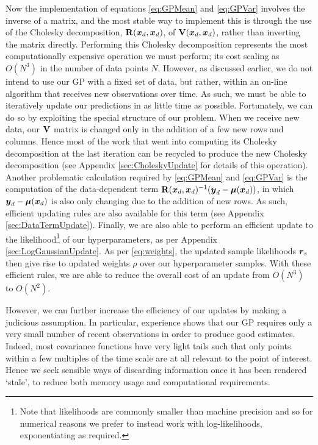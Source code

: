 \documentclass{acmsmall}
\begin{document}
\noindent Now the implementation of equations \eqref{eq:GPMean} and \eqref{eq:GPVar} involves the inverse of a matrix, and the most stable way to implement this is through the use of the Cholesky decomposition, $\mathbf{R}(\boldsymbol{x}_d,\boldsymbol{x}_d)$, of $\mathbf{V}(\boldsymbol{x}_d,\boldsymbol{x}_d)$, rather than inverting the matrix directly. %
Performing this Cholesky decomposition represents the most computationally expensive operation we must perform; its cost scaling as $O(N^3)$ in the number of data points $N$. However, as discussed earlier, we do not intend to use our GP with a fixed set of data, but rather, within an on-line algorithm that receives new observations over time. As such, we must be able to iteratively update our predictions in as little time as possible. Fortunately, we can do so by exploiting the special structure of our problem. When we receive new data, our $\mathbf{V}$ matrix is changed only in the addition of a few new rows and columns. Hence most of the work that went into computing its Cholesky decomposition at the last iteration can be recycled to produce the new Cholesky decomposition (see Appendix \ref{sec:CholeskyUpdate} for details of this operation). Another problematic calculation required by \eqref{eq:GPMean} and \eqref{eq:GPVar} is the computation of the data-dependent term $\mathbf{R}(\boldsymbol{x}_d,\boldsymbol{x}_d)^{-1}(\boldsymbol{y}_d-\boldsymbol{\mu}(\boldsymbol{x}_d))$, in which $\boldsymbol{y}_d-\boldsymbol{\mu}(\boldsymbol{x}_d)$ is also only changing due to the addition of new rows. As such, efficient updating rules are also available for this term (see Appendix \ref{sec:DataTermUpdate}). Finally, we are also able to perform an efficient update to the likelihood\footnote{Note that likelihoods are commonly smaller than machine precision and so for numerical reasons we prefer to instead work with log-likelihoods, exponentiating as required.} of our hyperparameters, as per Appendix \ref{sec:LogGaussianUpdate}. As per \eqref{eq:weights}, the updated sample likelihoods $\boldsymbol{r}_s$ then give rise to updated weights $\rho$ over our hyperparameter samples. With these efficient rules, we are able to reduce the overall cost of an update from $O(N^3)$ to $O(N^2)$.

However, we can further increase the efficiency of our updates by making a judicious assumption. In particular, experience shows that our GP requires only a very small number of recent observations in order to produce good estimates. Indeed, most covariance functions have very light tails such that only points within a few multiples of the time scale are at all relevant to the point of interest. Hence we seek sensible ways of discarding information once it has been rendered `stale', to reduce both memory usage and computational requirements.
\end{document}

